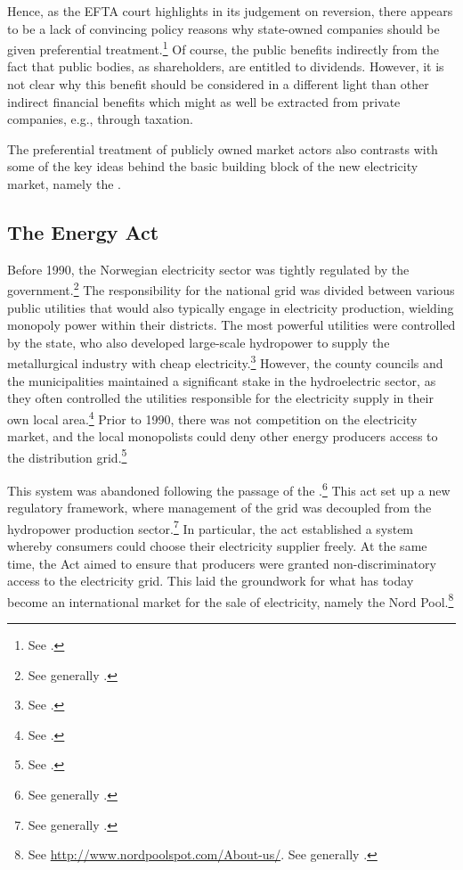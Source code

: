 Hence, as the EFTA court highlights in its judgement on reversion, there appears to be a lack of convincing policy reasons why state-owned companies should be given preferential treatment.\footnote{See \cite[84-87]{efta07}.} Of course, the public benefits indirectly from the fact that public bodies, as shareholders, are entitled to dividends. However, it is not clear why this benefit should be considered in a different light than other indirect financial benefits which might as well be extracted from private companies, e.g., through taxation.

The preferential treatment of publicly owned market actors also contrasts with some of the key ideas behind the basic building block of the new electricity market, namely the \cite{ea90}.

\subsection{The Energy Act}\label{sec:ea}

Before 1990, the Norwegian electricity sector was tightly regulated by the government.\footnote{See generally \cite{bye05,skjold07}.} The responsibility for the national grid was divided between various public utilities that would also typically engage in electricity production, wielding monopoly power within their districts. The most powerful utilities were controlled by the state, who also developed large-scale hydropower to supply the metallurgical industry with cheap electricity.\footnote{See \cite[67-71]{thue96}.} However, the county councils and the municipalities maintained a significant stake in the hydroelectric sector, as they often controlled the utilities responsible for the electricity supply in their own local area.\footnote{See \cite[85]{thue96}.} 
Prior to 1990, there was not competition on the electricity market, and the local monopolists could deny other energy producers access to the distribution grid.\footnote{See \cite[83-84]{uleberg08}.}


This system was abandoned following the passage of the \cite{ea90}.\footnote{See generally \cite{bibow11}.} This act set up a new regulatory framework, where management of the grid was decoupled from the hydropower production sector.\footnote{See generally \cite{bye05}.} In particular, the act established a system whereby consumers could choose their electricity supplier freely. At the same time, the Act aimed to ensure that producers were granted non-discriminatory access to the electricity grid. This laid the groundwork for what has today become an international market for the sale of electricity, namely the Nord Pool.\footnote{See \url{http://www.nordpoolspot.com/About-us/}. See generally \cite{skjold07,galtung07}.}

